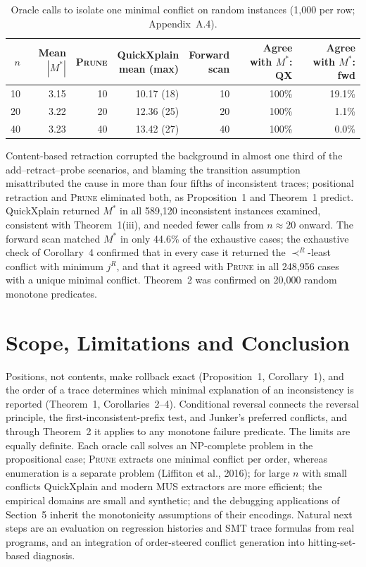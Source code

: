 \documentclass[11pt,reqno]{amsart}
\theoremstyle{plain}
\theoremstyle{definition}
\newcommand{\Mstar}{M^{*}}
\newcommand{\PRUNE}{\textsc{Prune}}
\begin{document}
\begin{table}[t]
\centering
\caption{Oracle calls to isolate one minimal conflict on random instances
(1{,}000 per row; Appendix~A.4).}
\small
\begin{tabular}{@{}rrrrrrr@{}}
\toprule
$n$ & Mean $|\Mstar|$ & \PRUNE & \makecell[r]{QuickXplain\\mean (max)} & \makecell[r]{Forward\\scan} & \makecell[r]{Agree with\\$\Mstar$: QX} & \makecell[r]{Agree with\\$\Mstar$: fwd}\\
\midrule
10 & 3.15 & 10 & 10.17 (18) & 10 & 100\% & 19.1\%\\
20 & 3.22 & 20 & 12.36 (25) & 20 & 100\% & 1.1\%\\
40 & 3.23 & 40 & 13.42 (27) & 40 & 100\% & 0.0\%\\
\bottomrule
\end{tabular}
\end{table}

Content-based retraction corrupted the background in almost one third of the
add--retract--probe scenarios, and blaming the transition assumption misattributed
the cause in more than four fifths of inconsistent traces; positional retraction
and \PRUNE{} eliminated both, as Proposition~1 and Theorem~1 predict. QuickXplain
returned $\Mstar$ in all 589{,}120 inconsistent instances examined, consistent with
Theorem~1(iii), and needed fewer calls from $n\approx20$ onward. The forward scan
matched $\Mstar$ in only 44.6\% of the exhaustive cases; the exhaustive check of
Corollary~4 confirmed that in every case it returned the $\prec^R$-least conflict
with minimum $j^R$, and that it agreed with \PRUNE{} in all 248{,}956 cases with a
unique minimal conflict. Theorem~2 was confirmed on 20{,}000 random monotone
predicates.

\section{Scope, Limitations and Conclusion}
Positions, not contents, make rollback exact (Proposition~1, Corollary~1), and the
order of a trace determines which minimal explanation of an inconsistency is
reported (Theorem~1, Corollaries~2--4). Conditional reversal connects the reversal
principle, the first-inconsistent-prefix test, and Junker's preferred conflicts,
and through Theorem~2 it applies to any monotone failure predicate. The limits are
equally definite. Each oracle call solves an NP-complete problem in the
propositional case; \PRUNE{} extracts one minimal conflict per order, whereas
enumeration is a separate problem (Liffiton et al., 2016); for large $n$ with small
conflicts QuickXplain and modern MUS extractors are more efficient; the empirical
domains are small and synthetic; and the debugging applications of Section~5 inherit
the monotonicity assumptions of their encodings. Natural next steps are an
evaluation on regression histories and SMT trace formulas from real programs, and
an integration of order-steered conflict generation into hitting-set-based
diagnosis.
\end{document}
